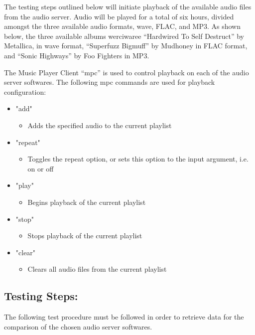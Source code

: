 \documentclass[11pt,a4paper]{scrreprt}
\begin{document}
The testing steps outlined below will initiate playback of the available
audio files from the audio server. Audio will be played for a total of
six hours, divided amongst the three available audio formats, wave,
FLAC, and MP3. As shown below, the three available albums werciwaree
``Hardwired To Self Destruct'' by Metallica, in wave format, ``Superfuzz
Bigmuff'' by Mudhoney in FLAC format, and ``Sonic Highways'' by Foo
Fighters in MP3.

The Music Player Client ``mpc'' is used to control playback on each of
the audio server softwares. The following mpc commands are used for
playback configuration:

\begin{itemize}
 \item "add"
 \begin{itemize}
  \item Adds the specified audio to the current playlist
 \end{itemize}
 \item "repeat"
 \begin{itemize}
  \item Toggles the repeat option, or sets this option to the input argument, i.e. on
   or off
  \end{itemize}
 \item "play"
 \begin{itemize}
  \item Begins playback of the current playlist
 \end{itemize}
 \item "stop"
 \begin{itemize}
  \item Stops playback of the current playlist
 \end{itemize}
 \item "clear"
 \begin{itemize}
  \item Clears all audio files from the current playlist
 \end{itemize}
\end{itemize}

\subsection{Testing Steps:}\label{testing-steps}

The following test procedure must be followed in order to retrieve data
for the comparison of the chosen audio server softwares.
\end{document}
